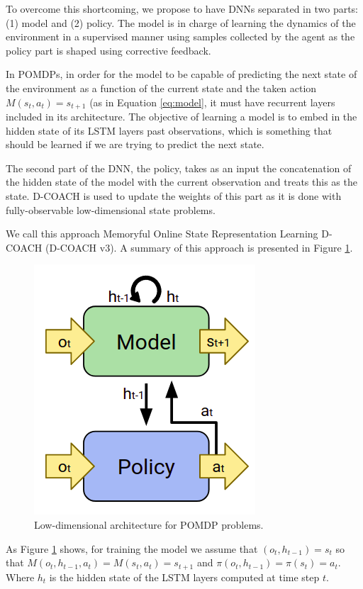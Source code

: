 To overcome this shortcoming, we propose to have DNNs separated in two parts: (1) model and (2) policy. The model is in charge of learning the dynamics of the environment in a supervised manner using samples collected by the agent as the policy part is shaped using corrective feedback. 

In POMDPs, in order for the model to be capable of predicting the next state of the environment as a function of the current state and the taken action $M(s_{t},a_{t}) = s_{t+1}$ (as in Equation \ref{eq:model}, it must have recurrent layers included in its architecture. The objective of learning a model is to embed in the hidden state of its LSTM layers past observations, which is something that should be learned if we are trying to predict the next state. 

The second part of the DNN, the policy, takes as an input the concatenation of the hidden state of the model with the current observation and treats this as the state. D-COACH is used to update the weights of this part as it is done with fully-observable low-dimensional state problems.

We call this approach Memoryful Online State Representation Learning D-COACH (D-COACH v3). A summary of this approach is presented in Figure \ref{fig:mb_dcoach}.

\begin{figure}[h]
    \centering
    \includegraphics[width=0.4\linewidth]{imagenes/cap4/model_based_dcoach.png}
    \caption{Low-dimensional architecture for POMDP problems.}
    \label{fig:mb_dcoach}
\end{figure}

As Figure \ref{fig:mb_dcoach} shows, for training the model we assume that $(o_{t}, h_{t-1}) = s_{t}$ so that $M(o_{t}, h_{t-1},a_{t}) =M(s_{t},a_{t}) = s_{t+1}$ and $\pi(o_{t}, h_{t-1})=\pi(s_{t})=a_{t}$. Where $h_{t}$ is the hidden state of the LSTM layers computed at time step $t$.


